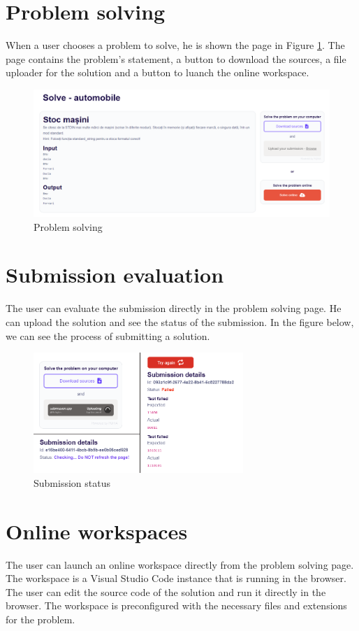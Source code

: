 \documentclass[12pt,a4paper]{report}
\begin{document}
\section{Problem solving}
When a user chooses a problem to solve, he is shown the page in Figure \ref{fig:problem-solving}. The page contains the problem's statement, a button to download the sources, a file uploader for the solution and a button to luanch the online workspace. 
\begin{figure}[h]
	\centering
	\includegraphics[width=\linewidth]{./pics/solve.png}
	\caption{Problem solving}
	\label{fig:problem-solving}
\end{figure}

\section{Submission evaluation}
The user can evaluate the submission directly in the problem solving page. He can upload the solution and see the status of the submission. In the figure below, we can see the process of submitting a solution.

\begin{figure}[h]
	\centering
	\includegraphics[width=300px]{./pics/submission-status.png}
	\caption{Submission status}
	\label{fig:submission-status}
\end{figure}

\section{Online workspaces}
The user can launch an online workspace directly from the problem solving page. The workspace is a Visual Studio Code instance that is running in the browser. The user can edit the source code of the solution and run it directly in the browser. The workspace is preconfigured with the necessary files and extensions for the problem.
\end{document}
